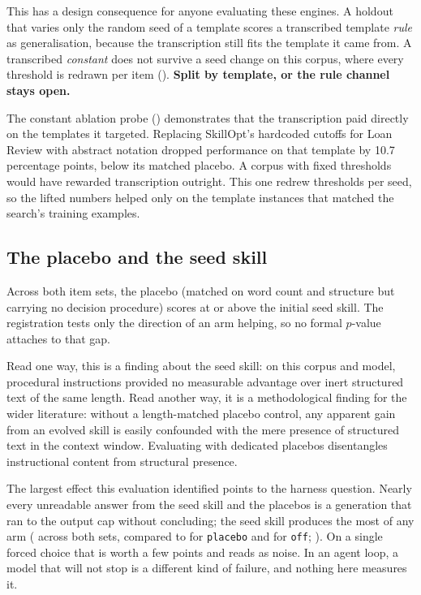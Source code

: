 This has a design consequence for anyone evaluating these engines. A holdout
that varies only the random seed of a template scores a transcribed template
\emph{rule} as generalisation, because the transcription still fits the
template it came from. A transcribed \emph{constant} does not survive a seed
change on this corpus, where every threshold is redrawn per item
(). \textbf{Split by template, or the rule channel stays
open.}

The constant ablation probe () demonstrates that the
transcription paid directly on the templates it targeted. Replacing SkillOpt's
hardcoded cutoffs for Loan Review with abstract notation dropped performance on
that template by 10.7 percentage points, below its matched placebo. A corpus
with fixed thresholds would have rewarded transcription outright. This one
redrew thresholds per seed, so the lifted numbers helped only on the template
instances that matched the search's training examples.

\subsection{The placebo and the seed skill}

Across both item sets, the placebo (matched on word count and structure but
carrying no decision procedure) scores at or above the initial seed skill. The
registration tests only the direction of an arm helping, so no formal $p$-value
attaches to that gap.

Read one way, this is a finding about the seed skill: on this corpus and model,
procedural instructions provided no measurable advantage over inert structured
text of the same length. Read another way, it is a methodological finding for
the wider literature: without a length-matched placebo control, any apparent
gain from an evolved skill is easily confounded with the mere presence of
structured text in the context window. Evaluating with dedicated placebos
disentangles instructional content from structural presence.

The largest effect this evaluation identified points to the harness question.
Nearly every unreadable answer from the seed skill and the placebos is a
generation that ran to the output cap without concluding; the seed skill
produces the most of any arm (\NUM{\atCapOn} across both sets, compared to
\NUM{\atCapPlacebo} for \texttt{placebo} and \NUM{\atCapOff} for \texttt{off};
). On a single forced choice that is worth a few points and
reads as noise. In an agent loop, a model that will not stop is a different
kind of failure, and nothing here measures it.

